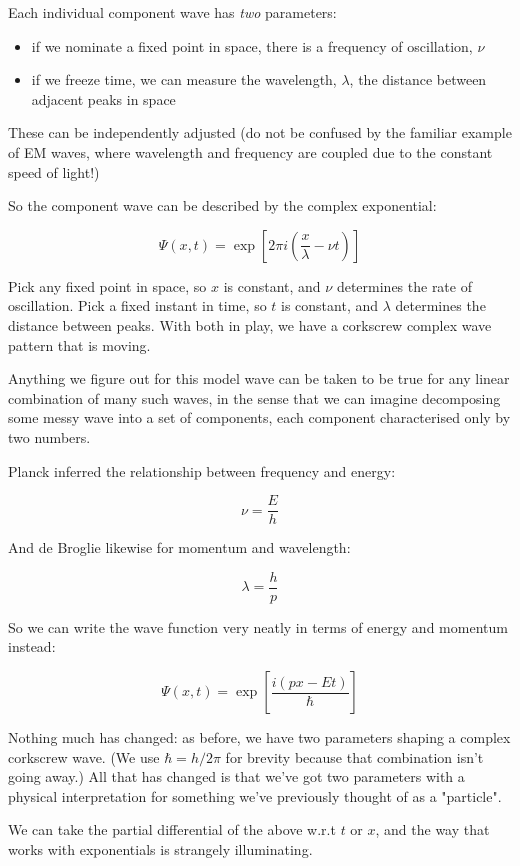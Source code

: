 Each individual component wave has \textit{two} parameters:

\begin{itemize}
  \item if we nominate a fixed point in space, there is a frequency of oscillation, $\nu$
  \item if we freeze time, we can measure the wavelength, $\lambda$, the distance between adjacent peaks in space
\end{itemize}

These can be independently adjusted (do not be confused by the familiar example of EM waves, where wavelength and frequency are coupled due to the constant speed of light!)

So the component wave can be described by the complex exponential:

$$
\Psi(x, t) = \exp \left[ 2\pi i(\frac{x}{\lambda} - \nu t) \right]
$$

Pick any fixed point in space, so $x$ is constant, and $\nu$ determines the rate of oscillation. Pick a fixed instant in time, so $t$ is constant, and $\lambda$ determines the distance between peaks. With both in play, we have a corkscrew complex wave pattern that is moving.

Anything we figure out for this model wave can be taken to be true for any linear combination of many such waves, in the sense that we can imagine decomposing some messy wave into a set of components, each component characterised only by two numbers.

Planck inferred the relationship between frequency and energy:

$$\nu = \frac{E}{h}$$

And de Broglie likewise for momentum and wavelength:

$$\lambda = \frac{h}{p}$$

So we can write the wave function very neatly in terms of energy and momentum instead:

$$
\Psi(x, t) = \exp \left[ {\frac{i(px - Et)}{\hbar}} \right]
$$

Nothing much has changed: as before, we have two parameters shaping a complex corkscrew wave. (We use $\hbar = h/2\pi$ for brevity because that combination isn't going away.) All that has changed is that we've got two parameters with a physical interpretation for something we've previously thought of as a "particle".

We can take the partial differential of the above w.r.t $t$ or $x$, and the way that works with exponentials is strangely illuminating.

